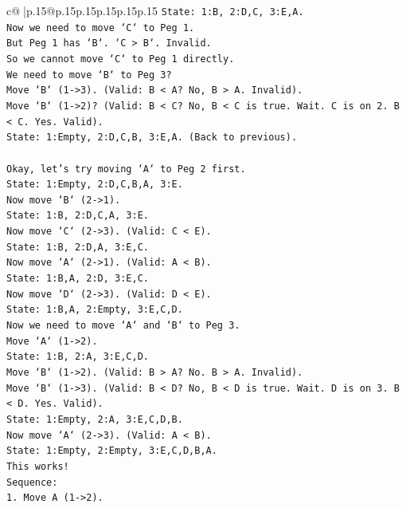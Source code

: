 \documentclass{article}
\begin{document}
{\begin{supertabular}{c@{$\;$}|p{.15\linewidth}@{}p{.15\linewidth}p{.15\linewidth}p{.15\linewidth}p{.15\linewidth}p{.15\linewidth}}
{{{\texttt{State: 1:B, 2:D,C, 3:E,A.} \\
\texttt{Now we need to move `C` to Peg 1.} \\
\texttt{But Peg 1 has `B`. `C > B`. Invalid.} \\
\texttt{So we cannot move `C` to Peg 1 directly.} \\
\texttt{We need to move `B` to Peg 3?} \\
\texttt{Move `B` (1{-}>3). (Valid: B < A? No, B > A. Invalid).} \\
\texttt{Move `B` (1{-}>2)? (Valid: B < C? No, B < C is true. Wait. C is on 2. B < C. Yes. Valid).} \\
\texttt{State: 1:Empty, 2:D,C,B, 3:E,A. (Back to previous).} \\
\\ 
\texttt{Okay, let's try moving `A` to Peg 2 first.} \\
\texttt{State: 1:Empty, 2:D,C,B,A, 3:E.} \\
\texttt{Now move `B` (2{-}>1).} \\
\texttt{State: 1:B, 2:D,C,A, 3:E.} \\
\texttt{Now move `C` (2{-}>3). (Valid: C < E).} \\
\texttt{State: 1:B, 2:D,A, 3:E,C.} \\
\texttt{Now move `A` (2{-}>1). (Valid: A < B).} \\
\texttt{State: 1:B,A, 2:D, 3:E,C.} \\
\texttt{Now move `D` (2{-}>3). (Valid: D < E).} \\
\texttt{State: 1:B,A, 2:Empty, 3:E,C,D.} \\
\texttt{Now we need to move `A` and `B` to Peg 3.} \\
\texttt{Move `A` (1{-}>2).} \\
\texttt{State: 1:B, 2:A, 3:E,C,D.} \\
\texttt{Move `B` (1{-}>2). (Valid: B > A? No. B > A. Invalid).} \\
\texttt{Move `B` (1{-}>3). (Valid: B < D? No, B < D is true. Wait. D is on 3. B < D. Yes. Valid).} \\
\texttt{State: 1:Empty, 2:A, 3:E,C,D,B.} \\
\texttt{Now move `A` (2{-}>3). (Valid: A < B).} \\
\texttt{State: 1:Empty, 2:Empty, 3:E,C,D,B,A.} \\
\texttt{This works!} \\
\texttt{Sequence:} \\
\texttt{1. Move A (1{-}>2).} \\
}}}
\end{supertabular}}
\end{document}
